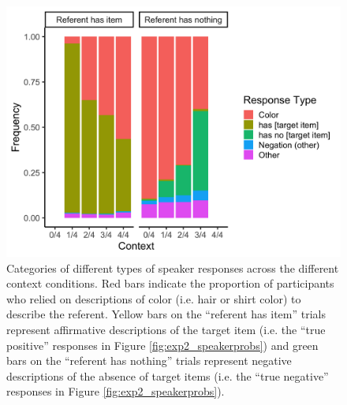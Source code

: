 \documentclass[man, floatsintext, noapacite]{apa6}
\begin{document}
\begin{figure}[t]
\begin{center} 
\includegraphics[width=6in]{figures/experiment2/speaker_responses_v1.png}
\caption{\label{fig:exp2_props} Categories of different types of speaker responses across the different context conditions. Red bars indicate the proportion of participants who relied on descriptions of color (i.e. hair or shirt color) to describe the referent. Yellow bars on the ``referent has item'' trials represent affirmative descriptions of the target item (i.e. the ``true positive'' responses in Figure \ref{fig:exp2_speakerprobs}) and green bars on the ``referent has nothing'' trials represent negative descriptions of the absence of target items (i.e. the ``true negative'' responses in Figure \ref{fig:exp2_speakerprobs}). }
\end{center} 
\end{figure}
\end{document}
